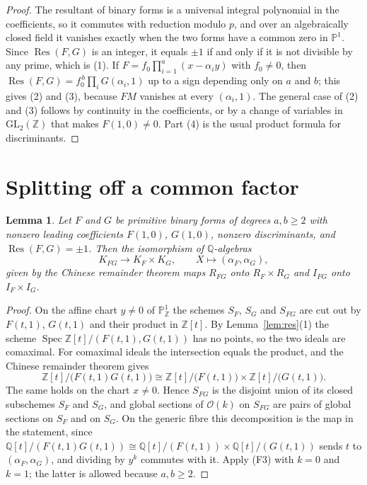 \documentclass[11pt]{amsart}
\newtheorem{lemma}[theorem]{Lemma}
\theoremstyle{definition}
\newcommand{\ZZ}{\mathbb{Z}}
\newcommand{\QQ}{\mathbb{Q}}
\newcommand{\PP}{\mathbb{P}}
\newcommand{\OO}{\mathcal{O}}
\DeclareMathOperator{\Res}{Res}
\DeclareMathOperator{\Spec}{Spec}
\begin{document}
\begin{proof}
The resultant of binary forms is a universal integral polynomial in the coefficients, so it commutes with reduction modulo $p$, and over an algebraically closed field it vanishes exactly when the two forms have a common zero in $\PP^1$. Since $\Res(F,G)$ is an integer, it equals $\pm1$ if and only if it is not divisible by any prime, which is (1). If $F=f_0\prod_{i=1}^a(x-\alpha_iy)$ with $f_0\neq0$, then $\Res(F,G)=f_0^{\,b}\prod_iG(\alpha_i,1)$ up to a sign depending only on $a$ and $b$; this gives (2) and (3), because $FM$ vanishes at every $(\alpha_i,1)$. The general case of (2) and (3) follows by continuity in the coefficients, or by a change of variables in $\mathrm{GL}_2(\ZZ)$ that makes $F(1,0)\neq0$. Part (4) is the usual product formula for discriminants.
\end{proof}

\section{Splitting off a common factor}\label{sec:split}

\begin{lemma}\label{lem:split}
Let $F$ and $G$ be primitive binary forms of degrees $a,b\ge2$ with nonzero leading coefficients $F(1,0)$, $G(1,0)$, nonzero discriminants, and $\Res(F,G)=\pm1$. Then the isomorphism of $\QQ$-algebras
\[
K_{FG}\longrightarrow K_F\times K_G,\qquad X\longmapsto(\alpha_F,\alpha_G),
\]
given by the Chinese remainder theorem maps $R_{FG}$ onto $R_F\times R_G$ and $I_{FG}$ onto $I_F\times I_G$.
\end{lemma}

\begin{proof}
On the affine chart $y\neq0$ of $\PP^1_\ZZ$ the schemes $S_F$, $S_G$ and $S_{FG}$ are cut out by $F(t,1)$, $G(t,1)$ and their product in $\ZZ[t]$. By Lemma~\ref{lem:res}(1) the scheme $\Spec\ZZ[t]/(F(t,1),G(t,1))$ has no points, so the two ideals are comaximal. For comaximal ideals the intersection equals the product, and the Chinese remainder theorem gives
\[
\ZZ[t]/\bigl(F(t,1)G(t,1)\bigr)\cong\ZZ[t]/\bigl(F(t,1)\bigr)\times\ZZ[t]/\bigl(G(t,1)\bigr).
\]
The same holds on the chart $x\neq0$. Hence $S_{FG}$ is the disjoint union of its closed subschemes $S_F$ and $S_G$, and global sections of $\OO(k)$ on $S_{FG}$ are pairs of global sections on $S_F$ and on $S_G$. On the generic fibre this decomposition is the map in the statement, since $\QQ[t]/(F(t,1)G(t,1))\cong\QQ[t]/(F(t,1))\times\QQ[t]/(G(t,1))$ sends $t$ to $(\alpha_F,\alpha_G)$, and dividing by $y^k$ commutes with it. Apply (F3) with $k=0$ and $k=1$; the latter is allowed because $a,b\ge2$.
\end{proof}
\end{document}
